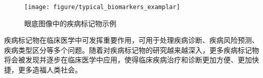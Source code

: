 \begin{figure}[h]
	\centering
	\texttt{[image: figure/typical\_biomarkers\_examplar]}
	\caption{眼底图像中的疾病标记物示例}
	\label{mul_fig:medical_imaging_biomarkers_examplar}
\end{figure}





疾病标记物在临床医学中可发挥重要作用，可用于处理疾病诊断、疾病风险预测、疾病类型区分等多个问题。随着对疾病标记物的研究越来越深入，更多疾病标记物将会被发现并逐步在临床医学中应用，使得临床疾病治疗和诊断更加方便、更加快捷，更多造福人类社会。

